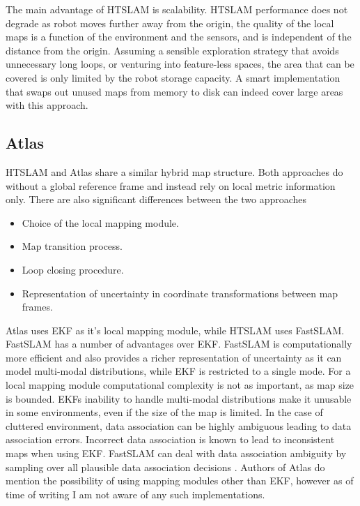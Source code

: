 The main advantage of HTSLAM is scalability. HTSLAM performance does
not degrade as robot moves further away from the origin, the quality
of the local maps is a function of the environment and the sensors,
and is independent of the distance from the origin. Assuming a
sensible exploration strategy that avoids unnecessary long loops, or
venturing into feature-less spaces, the area that can be covered is
only limited by the robot storage capacity. A smart implementation
that swaps out unused maps from memory to disk can indeed cover large
areas with this approach.

\subsection{Atlas}

HTSLAM and Atlas share a similar hybrid map structure. Both approaches
do without a global reference frame and instead rely on local metric
information only. There are also significant differences between the
two approaches

\begin{itemize}
\item Choice of the local mapping module.
\item Map transition process.
\item Loop closing procedure.
\item Representation of uncertainty in coordinate transformations
  between map frames.
\end{itemize}

Atlas uses EKF as it's local mapping module, while HTSLAM uses
FastSLAM. FastSLAM has a number of advantages over EKF. FastSLAM is
computationally more efficient and also provides a richer
representation of uncertainty as it can model multi-modal
distributions, while EKF is restricted to a single mode. For a local
mapping module computational complexity is not as important, as map
size is bounded. EKFs inability to handle multi-modal distributions
make it unusable in some environments, even if the size of the map is
limited. In the case of cluttered environment, data association can be
highly ambiguous leading to data association errors. Incorrect data
association is known to lead to inconsistent maps when using EKF.
FastSLAM can deal with data association ambiguity by sampling over all
plausible data association decisions
\cite{fastslam,Montemerlo02d,nieto2003}. Authors of Atlas do mention
the possibility of using mapping modules other than EKF, however as of
time of writing I am not aware of any such implementations.

